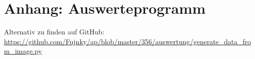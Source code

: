 \pagebreak
\appendix
\section{Anhang: Auswerteprogramm}
\label{sec:prog}
Alternativ zu finden auf GitHub: \url{https://github.com/Fujnky/ap/blob/master/356/auswertung/generate_data_from_image.py}

